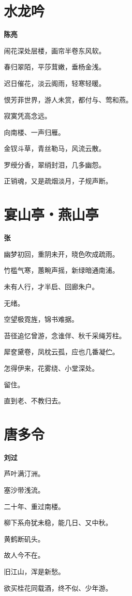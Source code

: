 \documentclass[12pt,a4paper]{ctexbook}
\begin{document}
\section{水龙吟}
\textbf{陈亮}\par\vspace{0.5em}
闹花深处层楼，画帘半卷东风软。\par
春归翠陌，平莎茸嫩，垂杨金浅。\par
迟日催花，淡云阁雨，轻寒轻暖。\par
恨芳菲世界，游人未赏，都付与、莺和燕。\par
寂寞凭高念远。\par
向南楼、一声归雁。\par
金钗斗草，青丝勒马，风流云散。\par
罗绶分香，翠绡封泪，几多幽怨。\par
正销魂，又是疏烟淡月，子规声断。\par

\section{宴山亭・燕山亭}
\textbf{张}\par\vspace{0.5em}
幽梦初回，重阴未开，晓色吹成疏雨。\par
竹槛气寒，蕙畹声摇，新绿暗通南浦。\par
未有人行，才半启、回廊朱户。\par
无绪。\par
空望极霓旌，锦书难据。\par
苔径追忆曾游，念谁伴、秋千采绳芳柱。\par
犀奁黛卷，凤枕云孤，应也几番凝伫。\par
怎得伊来，花雾绕、小堂深处。\par
留住。\par
直到老、不教归去。\par

\section{唐多令}
\textbf{刘过}\par\vspace{0.5em}
芦叶满汀洲。\par
塞沙带浅流。\par
二十年、重过南楼。\par
柳下系舟犹未稳，能几日、又中秋。\par
黄鹤断矶头。\par
故人今不在。\par
旧江山，浑是新愁。\par
欲买桂花同载酒，终不似、少年游。\par
\end{document}
